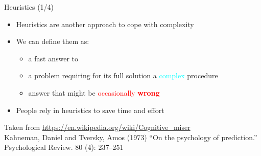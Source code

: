 \documentclass{beamer}
\begin{document}
\begin{frame}
{\centerline{Heuristics (1/4)}}
\begin{itemize}
    \item Heuristics are another approach to cope with complexity
    \item We can define them as:
    \begin{itemize}
        \item a fast answer to 
        \item a problem requiring for its full solution a \textcolor{cyan}{complex} procedure
        \item answer that might be \textcolor{red}{occasionally \textbf{wrong}}
   \end{itemize} 
   \item People rely in heuristics to save time and effort
\end{itemize} 
\begin{center}
    \tiny{Taken from \url{https://en.wikipedia.org/wiki/Cognitive_miser}\\
    Kahneman, Daniel and Tversky, Amos (1973) ``On the psychology of prediction.'' Psychological Review. 80 (4): 237–251}
\end{center}

\end{frame}
\end{document}

